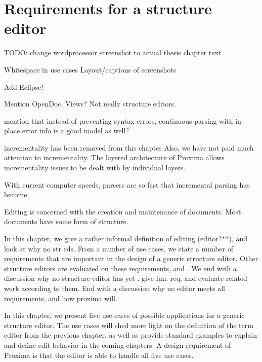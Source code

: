 \chapter{Requirements for a structure editor} %
\label{chap:requirements}




\bc

TODO: change wordprocessor screenshot to actual thesis chapter text

Whitespace in use cases
Layout/captions of screenshots

Add Eclipse!





Mention OpenDoc, Views? Not really structure editors.

mention that instead of preventing syntax errors, continuous parsing with in-place error 
info is a good model as well?

incrementality  has been removed from this chapter
Also, we have not paid much attention to incrementality. The layered architecture of Proxima allows incrementality issues to be dealt with by individual layers. 

With current computer speeds, parsers are so fast that incremental parsing has become %
\ec

\bc
Editing is concerned with the creation and maintenance of documents.  
Most documents have some form of structure. 

In this chapter, we give a rather informal definition of editing (editor?**), and look at why no str eds. From a number of use cases, we state a number of requirements that are important in the design of a generic structure editor. Other structure editors are evaluated on these requirements, and . We end with a discussion why no structure editor has yet .  give fun. req. and evaluate related work according to them. End with a discussion why no editor meets all requirements, and how proxima will.
\ec

In this chapter, we present five use cases of possible applications for a generic structure editor. The use cases will shed more light on the definition of the term editor from the previous chapter, as well as provide standard examples to explain and define edit behavior in the coming chapters. A design requirement of Proxima is that the editor is able to handle all five use cases. 

